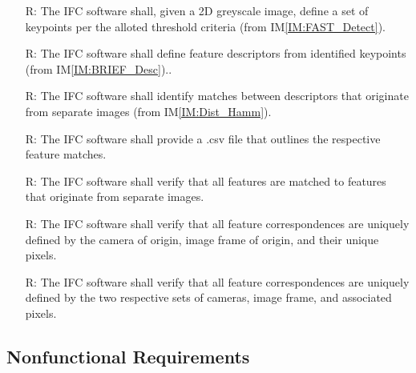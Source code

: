 \documentclass[12pt]{article}
\newcommand{\iref}[1]{IM\ref{#1}}
\newcounter{reqnum} %
\begin{document}
\begin{itemize}
\item[R\refstepcounter{reqnum}\thereqnum \label{R:DetectKeypoints}:] The IFC software shall, given a 2D 
greyscale image, define a set of keypoints per the alloted threshold criteria (from 
\iref{IM:FAST_Detect}).

\item[R\refstepcounter{reqnum}\thereqnum \label{R:DefineDescriptors}:] The IFC software shall 
define feature descriptors from identified keypoints (from \iref{IM:BRIEF_Desc})..

\item[R\refstepcounter{reqnum}\thereqnum \label{R:CompareDescriptors}:] The IFC software shall 
identify matches between descriptors that originate from separate images (from \iref{IM:Dist_Hamm}).

\item[R\refstepcounter{reqnum}\thereqnum \label{R:OutputCorrespondences}:] The IFC software shall 
provide a .csv file that outlines the respective feature matches.

\item[R\refstepcounter{reqnum}\thereqnum \label{R:Distinct Images}:] The IFC software shall verify 
that all features are matched to features that originate from separate images.

\item[R\refstepcounter{reqnum}\thereqnum \label{R:Unique Keypoint_IDs}:] The IFC software shall verify 
that all feature correspondences are uniquely defined by the camera of origin, image frame of origin, 
and their unique pixels.

\item[R\refstepcounter{reqnum}\thereqnum \label{R:Unique Match_IDs}:] The IFC software shall verify 
that all feature correspondences are uniquely defined by the two respective sets of cameras, image frame, 
and associated pixels.

\end{itemize}


\subsection{Nonfunctional Requirements}
\end{document}
